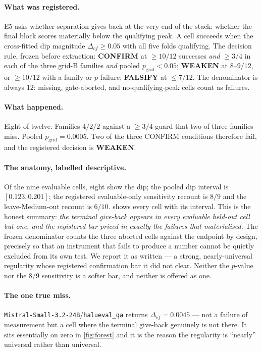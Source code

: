 \documentclass[10pt, letterpaper]{article}
\begin{document}
\paragraph{What was registered.} E5 asks whether separation gives back at the
very end of the stack: whether the final block scores materially below the
qualifying peak. A cell succeeds when the cross-fitted dip magnitude
$\Delta_{cf} \geq 0.05$ with all five folds qualifying. The decision rule, frozen
before extraction: \textbf{CONFIRM} at $\geq 10/12$ successes \emph{and}
$\geq 3/4$ in each of the three grid-B families \emph{and} pooled
$p_{\mathrm{grid}} < 0.05$; \textbf{WEAKEN} at $8$--$9/12$, or $\geq 10/12$ with a
family or $p$ failure; \textbf{FALSIFY} at $\leq 7/12$. The denominator is always
$12$: missing, gate-aborted, and no-qualifying-peak cells count as failures.

\paragraph{What happened.} Eight of twelve. Families $4/2/2$ against a $\geq 3/4$
guard that two of three families miss. Pooled $p_{\mathrm{grid}} = 0.0005$. Two
of the three CONFIRM conditions therefore fail, and the registered decision is
\textbf{WEAKEN}.

\paragraph{The anatomy, labelled descriptive.} Of the nine evaluable cells, eight
show the dip; the pooled dip interval is $[0.123, 0.201]$; the registered
evaluable-only sensitivity recount is $8/9$ and the leave-Medium-out recount is
$6/10$.  shows every cell with its interval. This is the honest
summary: \emph{the terminal give-back appears in every evaluable held-out cell but
one, and the registered bar priced in exactly the failures that materialised.}
The frozen denominator counts the three aborted cells against the endpoint by
design, precisely so that an instrument that fails to produce a number cannot be
quietly excluded from its own test. We report it as written --- a strong,
nearly-universal regularity whose registered confirmation bar it did not clear.
Neither the $p$-value nor the $8/9$ sensitivity is a softer bar, and neither is
offered as one.

\paragraph{The one true miss.} \texttt{Mistral-Small-3.2-24B}/\texttt{halueval\_qa}
returns $\Delta_{cf}=0.0045$ --- not a failure of measurement but a cell where the
terminal give-back genuinely is not there. It sits essentially on zero in
\cref{fig:forest} and it is the reason the regularity is ``nearly'' universal
rather than universal.
\end{document}

